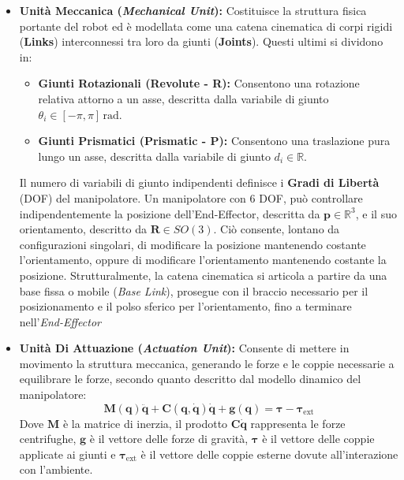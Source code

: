﻿\documentclass[11pt, a4paper]{article}
\begin{document}
\begin{itemize}
    \item \textbf{Unità Meccanica (\textit{Mechanical Unit}):} Costituisce la struttura fisica portante del robot ed è modellata come una catena cinematica di corpi rigidi (\textbf{Links}) interconnessi tra loro da giunti (\textbf{Joints}). Questi ultimi si dividono in:
    \begin{itemize}
        \item \textbf{Giunti Rotazionali (Revolute - R):} Consentono una rotazione relativa attorno a un asse, descritta dalla variabile di giunto $\theta_i \in [-\pi, \pi]\,\si{\radian}$.
        \item \textbf{Giunti Prismatici (Prismatic - P):} Consentono una traslazione pura lungo un asse, descritta dalla variabile di giunto $d_i \in \mathbb{R}$.
    \end{itemize}
    Il numero di variabili di giunto indipendenti definisce i \textbf{Gradi di Libertà} (DOF) del manipolatore. Un manipolatore con 6 DOF, può controllare indipendentemente la posizione dell'End-Effector, descritta da \(\boldsymbol{p}\in\mathbb{R}^3\), e il suo orientamento, descritto da \(\boldsymbol{R}\in SO(3)\). Ciò consente, lontano da configurazioni singolari, di modificare la posizione mantenendo costante l'orientamento, oppure di modificare l'orientamento mantenendo costante la posizione. Strutturalmente, la catena cinematica si articola a partire da una base fissa o mobile (\textit{Base Link}), prosegue con il braccio necessario per il posizionamento e il polso sferico per l'orientamento, fino a terminare nell'\textit{End-Effector}

    \item \textbf{Unità Di Attuazione (\textit{Actuation Unit}):} Consente di mettere in movimento la struttura meccanica, generando le forze e le coppie necessarie a equilibrare le forze, secondo quanto descritto dal modello dinamico del manipolatore:
    \[
        \boldsymbol{M}(\boldsymbol{q})\ddot{\boldsymbol{q}} + \boldsymbol{C}(\boldsymbol{q},\dot{\boldsymbol{q}})\dot{\boldsymbol{q}} + \boldsymbol{g}(\boldsymbol{q}) = \boldsymbol{\tau} - \boldsymbol{\tau}_{\text{ext}}
        \label{eq:robot_dynamics}
    \]
    Dove $\boldsymbol{M}$ è la matrice di inerzia, il prodotto $\boldsymbol{C}\dot{\boldsymbol{q}}$ rappresenta le forze centrifughe, $\boldsymbol{g}$ è il vettore delle forze di gravità, $\boldsymbol{\tau}$ è il vettore delle coppie applicate ai giunti e $\boldsymbol{\tau}_{\text{ext}}$ è il vettore delle coppie esterne dovute all'interazione con l'ambiente.


\end{itemize}
\end{document}
